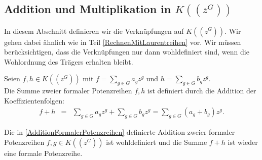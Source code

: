 \subsection{Addition und Multiplikation in $K((z^{G}))$}
%
%
%
%
%
%
In diesem Abschnitt definieren wir die Verknüpfungen auf $K((z^{G}))$. Wir gehen dabei ähnlich wie in Teil \ref{RechnenMitLaurentreihen} vor. Wir müssen berücksichtigen, dass die Verknüpfungen nur dann wohldefiniert sind, wenn die Wohlordnung des Trägers erhalten bleibt.
%
%
%
%
%
%
%
%
%
\begin{defn}\label{AdditionFormalerPotenzreihen}
Seien $f, h \in K\left(\left(z^G\right)\right)$ mit $f = \sum_{g \in G}^{} a_g z^g \text{ und } h = \sum_{g \in G}^{} b_g z^g$.\\
Die Summe zweier formaler Potenzreihen $f, h$ ist definiert durch die Addition der Koeffizientenfolgen:
\begin{eqnarray*}
f + h &=& \sum_{g \in G}^{} a_g z^g + \sum_{g \in G}^{} b_g z^g
= \sum_{g \in G}^{}\left(a_g + b_g\right)z^g. 
\end{eqnarray*}
\end{defn}
%
%
%
%
%
\begin{satz}\label{wohldefiniertheitAddition}
Die in \ref{AdditionFormalerPotenzreihen} definierte Addition zweier formaler Potenzreihen $f, g \in K\left(\left(z^{G}\right)\right)$ ist wohldefiniert und die Summe $f +h$ ist wieder eine formale Potenzreihe.
\end{satz}
